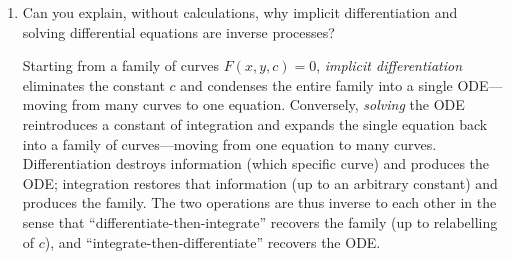 \documentclass{self-check}
\begin{document}
\begin{enumerate}[leftmargin=*, itemsep=8pt]
    \begin{answer}
      Both impose constraints that fix the free constants in the general solution. The distinction is where the conditions are applied:
      \begin{itemize}
        \item \emph{Initial conditions} specify the values of \(y\) (and its derivatives up to order \(n-1\)) all at the \emph{same} point \(x_{0}\). They match the physical setup of knowing the state of a system at one instant, and existence/uniqueness is guaranteed by Picard--Lindelöf.
        \item \emph{Boundary conditions} specify values of \(y\) (or its derivatives) at \emph{different} points---typically the two endpoints of an interval. They arise naturally in spatial problems; existence and uniqueness need not hold in general and require separate analysis (Sturm--Liouville theory, etc.).
      \end{itemize}
    \end{answer}
  \item Can you explain, without calculations, why implicit differentiation and solving differential equations are inverse processes?

    \begin{answer}
      Starting from a family of curves \(F(x,y,c)=0\), \emph{implicit differentiation} eliminates the constant \(c\) and condenses the entire family into a single ODE---moving from many curves to one equation. Conversely, \emph{solving} the ODE reintroduces a constant of integration and expands the single equation back into a family of curves---moving from one equation to many curves. Differentiation destroys information (which specific curve) and produces the ODE; integration restores that information (up to an arbitrary constant) and produces the family. The two operations are thus inverse to each other in the sense that ``differentiate-then-integrate'' recovers the family (up to relabelling of \(c\)), and ``integrate-then-differentiate'' recovers the ODE.
    \end{answer}
\end{enumerate}
\end{document}
